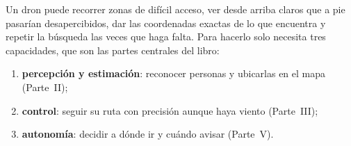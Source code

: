 Un dron puede recorrer zonas de difícil acceso, ver desde arriba claros que a pie pasarían
desapercibidos, dar las coordenadas exactas de lo que encuentra y repetir la búsqueda las veces que haga
falta. Para hacerlo solo necesita tres capacidades, que son las partes centrales del libro:
\begin{enumerate}
  \item \textbf{percepción y estimación}: reconocer personas y ubicarlas en el mapa (Parte~II);
  \item \textbf{control}: seguir su ruta con precisión aunque haya viento (Parte~III);
  \item \textbf{autonomía}: decidir a dónde ir y cuándo avisar (Parte~V).
\end{enumerate}
